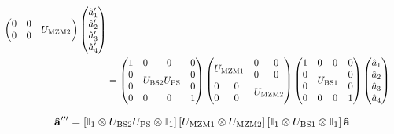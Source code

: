 \begin{equation}
\begin{split}
\begin{pmatrix}
			 0 & 0 & \multicolumn{2}{c}{\multirow{2}{*}{$U_\text{MZM2}$}} \\
			 0 & 0 & & \\
		\end{pmatrix}
		\begin{pmatrix}
			\hat{a}_1^\prime \\
			\hat{a}_2^\prime \\
			\hat{a}_3^\prime \\
			\hat{a}_4^\prime
		\end{pmatrix}
		\\
		&=
		\begin{pmatrix}
			 1 & 0 & 0 & 0 \\
			 0 & \multicolumn{2}{c}{\multirow{2}{*}{$U_\text{BS2}U_\text{PS}$}} & 0 \\
			 0 & & & 0 \\
			 0 & 0 & 0 & 1
		\end{pmatrix}
		\begin{pmatrix}
			 \multicolumn{2}{c}{\multirow{2}{*}{$U_\text{MZM1}$}} & 0 & 0 \\
			 & & 0 & 0 \\
			 0 & 0 & \multicolumn{2}{c}{\multirow{2}{*}{$U_\text{MZM2}$}} \\
			 0 & 0 & & \\
		\end{pmatrix}
		\begin{pmatrix}
			 1 & 0 & 0 & 0 \\
			 0 & \multicolumn{2}{c}{\multirow{2}{*}{$U_\text{BS1}$}} & 0 \\
			 0 & & & 0 \\
			 0 & 0 & 0 & 1
		\end{pmatrix}
		\begin{pmatrix}
			\hat{a}_1 \\
			\hat{a}_2 \\
			\hat{a}_3 \\
			\hat{a}_4
		\end{pmatrix}
	\end{split}
\end{equation}

\begin{equation}
	\vb{\hat{a}}^{\prime\prime\prime}
	=
	\left[
		\mathbb{I}_1
		\otimes
		U_\text{BS2}
		U_\text{PS}
		\otimes
		\mathbb{I}_1
	\right]
	\left[
		U_\text{MZM1}
		\otimes
		U_\text{MZM2}
	\right]
	\left[
		\mathbb{I}_1
		\otimes
		U_\text{BS1}
		\otimes
		\mathbb{I}_1
	\right]
	\vb{\hat{a}}
\end{equation}